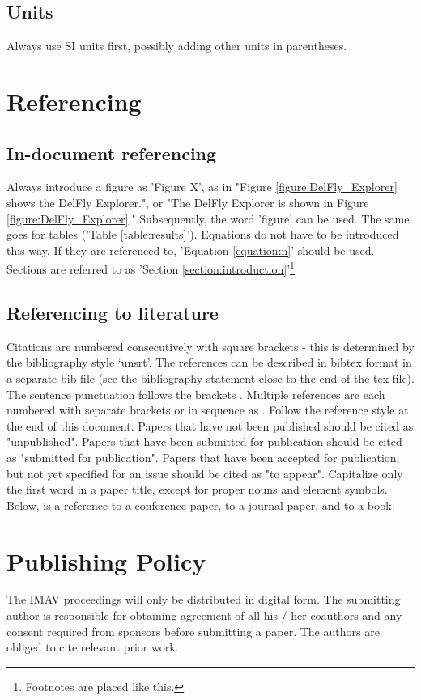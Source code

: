 \documentclass{article}
\begin{document}
\subsection{Units}
Always use SI units first, possibly adding other units in parentheses.

\section{Referencing}

\subsection{In-document referencing}
Always introduce a figure as 'Figure X', as in "Figure \ref{figure:DelFly_Explorer} shows the DelFly Explorer.", or "The DelFly Explorer is shown in Figure \ref{figure:DelFly_Explorer}." Subsequently, the word 'figure' can be used. The same goes for tables ('Table \ref{table:results}'). Equations do not have to be introduced this way. If they are referenced to, 'Equation \ref{equation:n}' should be used. Sections are referred to as 'Section \ref{section:introduction}'\footnote{Footnotes are placed like this.}

\subsection{Referencing to literature}
 Citations are numbered consecutively with square brackets \cite{DEWAGTER2014} - this is determined by the bibliography style `unsrt'. The references can be described in bibtex format in a separate bib-file (see the bibliography statement close to the end of the tex-file).  The sentence punctuation follows the brackets \cite{NOLFIPOWLIM}. Multiple references \cite{DEWAGTER2014,NOLFIPOWLIM} are each numbered with separate brackets or in sequence as \cite{DEWAGTER2014,NOLFIPOWLIM,BISHOP2006}.
Follow the reference style at the end of this document. Papers that have not been published should be cited as "unpublished". Papers that have been submitted for publication should be cited as "submitted for publication". Papers that have been accepted for publication, but not yet specified for an issue should be cited as "to appear". Capitalize only the first word in a paper title, except for proper nouns and element symbols.
Below, \cite{DEWAGTER2014} is a reference to a conference paper, \cite{NOLFIPOWLIM} to a journal paper, and \cite{BISHOP2006} to a book.

\section{Publishing Policy}
The IMAV proceedings will only be distributed in digital form. The submitting author is responsible for obtaining agreement of all his / her coauthors and any consent required from sponsors before submitting a paper. The authors are obliged to cite relevant prior work.
\end{document}
